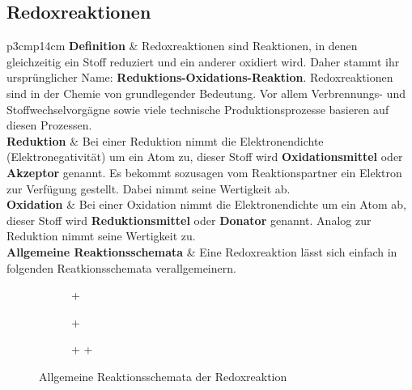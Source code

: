 \subsection{Redoxreaktionen}
\begin{longtable}{p{3cm}p{14cm}}
	\textbf{Definition}
		& Redoxreaktionen sind Reaktionen, in denen gleichzeitig ein Stoff reduziert und ein anderer oxidiert wird. Daher stammt ihr ursprünglicher Name: \textbf{Reduktions-Oxidations-Reaktion}. Redoxreaktionen sind in der Chemie von grundlegender Bedeutung. Vor allem Verbrennungs- und Stoffwechselvorgägne sowie viele technische Produktionsprozesse basieren auf diesen Prozessen.\\
	\hline
	\textbf{Reduktion}
		& Bei einer Reduktion nimmt die Elektronendichte (Elektronegativität) um ein Atom zu, dieser Stoff wird \textbf{Oxidationsmittel} oder \textbf{Akzeptor} genannt. Es bekommt sozusagen vom Reaktionspartner ein Elektron zur Verfügung gestellt. Dabei nimmt seine Wertigkeit ab.\\
	\hline
	\textbf{Oxidation}
		& Bei einer Oxidation nimmt die Elektronendichte um ein Atom ab, dieser Stoff wird \textbf{Reduktionsmittel} oder \textbf{Donator} genannt. Analog zur Reduktion nimmt seine Wertigkeit zu.\\
	\hline
	\textbf{Allgemeine Reaktionsschemata}
		& Eine Redoxreaktion lässt sich einfach in folgenden Reatkionsschemata verallgemeinern.
\end{longtable}
\begin{figure}[H]\centering
	\begin{subfigure}[H]{0.5\linewidth}\centering
		 \chemrel{->}  + 
	\end{subfigure}
	
	\begin{subfigure}[H]{0.5\linewidth}\centering
		 +  \chemrel{->}   
	\end{subfigure}
	
	\begin{subfigure}[H]{0.5\linewidth}\centering
		 +  \chemrel{->}  +  
	\end{subfigure}
	\caption{Allgemeine Reaktionsschemata der Redoxreaktion}
\end{figure}

